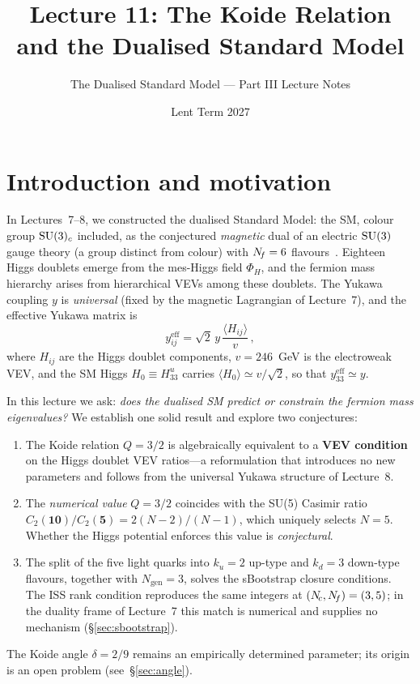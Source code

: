 \documentclass[11pt,a4paper]{article}
\title{\textbf{Lecture 11: The Koide Relation and the Dualised
Standard Model}}
\author{The Dualised Standard Model --- Part III Lecture Notes}
\date{Lent Term 2027}
\begin{document}
\maketitle

\tableofcontents
\newpage

\section{Introduction and motivation}
\label{sec:intro}

In Lectures~7--8, we constructed the dualised Standard Model: the
SM, colour group $\mathrm{SU}(3)_c$ included, as the conjectured
\emph{magnetic} dual of an electric $\mathrm{SU}(3)$ gauge theory (a group
distinct from colour) with $N_{\!f} = 6$
flavours~\cite{Sannino2024}.  Eighteen Higgs doublets emerge from
the mes-Higgs field $\Phi_H$, and the fermion mass hierarchy arises
from hierarchical VEVs among these doublets.  The Yukawa coupling
$y$ is \emph{universal} (fixed by the magnetic Lagrangian of
Lecture~7), and the effective Yukawa matrix is
\begin{equation}
  y_{ij}^{\text{eff}} = \sqrt{2}\,y\,\frac{\langle H_{ij}\rangle}{v}\,,
  \label{eq:yeff}
\end{equation}
where $H_{ij}$ are the Higgs doublet components, $v = 246$~GeV is
the electroweak VEV, and the SM Higgs $H_0 \equiv H^u_{33}$ carries
$\langle H_0\rangle \simeq v/\sqrt{2}$, so that $y^{\text{eff}}_{33}
\simeq y$.

In this lecture we ask: \emph{does the dualised SM predict or
constrain the fermion mass eigenvalues?}  We establish one solid
result and explore two conjectures:
\begin{enumerate}
\item[\textbf{(R)}] The Koide relation $Q = 3/2$ is algebraically
  equivalent to a \textbf{VEV condition} on the Higgs
  doublet VEV ratios---a reformulation that introduces no new
  parameters and follows from the universal Yukawa structure of
  Lecture~8.
\item[\textbf{(C1)}] The \emph{numerical value} $Q = 3/2$ coincides
  with the SU(5) Casimir ratio
  $C_2(\mathbf{10})/C_2(\mathbf{5}) = 2(N-2)/(N-1)$, which
  uniquely selects $N=5$.  Whether the Higgs potential enforces this
  value is \emph{conjectural}.
\item[\textbf{(C2)}] The split of the five light quarks into
  $k_u = 2$ up-type and $k_d = 3$ down-type flavours, together with
  $N_{\text{gen}} = 3$, solves the sBootstrap closure conditions.
  The ISS rank condition reproduces the same integers at
  $(N_{\!c},N_{\!f}) = (3,5)$; in the duality frame of Lecture~7 this match
  is numerical and supplies no mechanism (\S\ref{sec:sbootstrap}).
\end{enumerate}
The Koide angle $\delta = 2/9$ remains an empirically determined
parameter; its origin is an open problem (see~\S\ref{sec:angle}).
\end{document}
